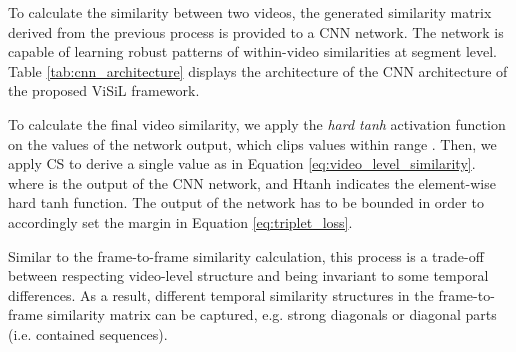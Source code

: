 \documentclass[10pt,twocolumn,letterpaper]{article}
\begin{document}
\begin{table}[t]
  \centering
  \caption{Architecture of the proposed network for video similarity learning. For the calculation of the output size, we assume that two videos with total number of  and  frames are provided.}
  \label{tab:cnn_architecture}
\end{table}

To calculate the similarity between two videos, the generated similarity matrix  derived from the previous process is provided to a CNN network. The network is capable of learning robust patterns of within-video similarities at segment level. Table \ref{tab:cnn_architecture} displays the architecture of the CNN architecture of the proposed ViSiL framework. 

To calculate the final video similarity, we apply the \textit{hard tanh} activation function on the values of the network output, which clips values within range . 
Then, we apply CS to derive a single value as in Equation \ref{eq:video_level_similarity}. 
where  is the output of the CNN network, and Htanh indicates the element-wise hard tanh function. The output of the network has to be bounded in order to accordingly set the margin in Equation \ref{eq:triplet_loss}. 

Similar to the frame-to-frame similarity calculation, this process is a trade-off between  respecting video-level structure and being invariant to some temporal differences. As a result, different temporal similarity structures in the frame-to-frame similarity matrix can be captured, e.g. strong diagonals or diagonal parts (i.e. contained sequences).
\end{document}
